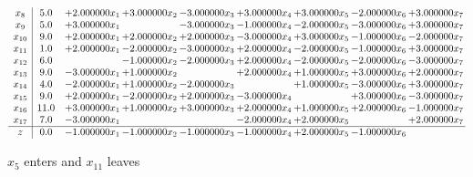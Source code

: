 \documentclass[10pt]{article}
\begin{document}
\[\begin{array}{c| c c@{\hskip 2pt} c@{\hskip 2pt} c@{\hskip 2pt} c@{\hskip 2pt} c@{\hskip 2pt} c@{\hskip 2pt} c@{\hskip 2pt} }
 x_{8}   &  5.0 & + 2.000000 x_{1} & + 3.000000 x_{2} & -3.000000 x_{3} & + 3.000000 x_{4} & + 3.000000 x_{5} & -2.000000 x_{6} & + 3.000000 x_{7}\\
 x_{9}   &  5.0 & + 3.000000 x_{1} &   & -3.000000 x_{3} & -1.000000 x_{4} & -2.000000 x_{5} & -3.000000 x_{6} & + 3.000000 x_{7}\\
 x_{10}   &  9.0 & + 2.000000 x_{1} & + 2.000000 x_{2} & + 2.000000 x_{3} & -3.000000 x_{4} & + 3.000000 x_{5} & -1.000000 x_{6} & -2.000000 x_{7}\\
 x_{11}   &  1.0 & + 2.000000 x_{1} & -2.000000 x_{2} & -3.000000 x_{3} & + 2.000000 x_{4} & -2.000000 x_{5} & -1.000000 x_{6} & + 3.000000 x_{7}\\
 x_{12}   &  6.0  &   & -1.000000 x_{2} & -2.000000 x_{3} & + 2.000000 x_{4} & -2.000000 x_{5} & -2.000000 x_{6} & -3.000000 x_{7}\\
 x_{13}   &  9.0 & -3.000000 x_{1} & + 1.000000 x_{2} &   & + 2.000000 x_{4} & + 1.000000 x_{5} & + 3.000000 x_{6} & + 2.000000 x_{7}\\
 x_{14}   &  4.0 & -2.000000 x_{1} & + 1.000000 x_{2} & -2.000000 x_{3} &   & + 1.000000 x_{5} & -3.000000 x_{6} & + 3.000000 x_{7}\\
 x_{15}   &  9.0 & + 2.000000 x_{1} & -2.000000 x_{2} & + 2.000000 x_{3} & -3.000000 x_{4} &   & + 3.000000 x_{6} & -3.000000 x_{7}\\
 x_{16}   &  11.0 & + 3.000000 x_{1} & + 1.000000 x_{2} & + 3.000000 x_{3} & + 2.000000 x_{4} & + 1.000000 x_{5} & + 2.000000 x_{6} & -1.000000 x_{7}\\
 x_{17}   &  7.0 & -3.000000 x_{1} &    &   & -2.000000 x_{4} & + 2.000000 x_{5} &   & + 2.000000 x_{7}\\
\hline
z    &  0.0 & -1.000000 x_{1} & -1.000000 x_{2} & -1.000000 x_{3} & -1.000000 x_{4} & + 2.000000 x_{5} & -1.000000 x_{6} &   \\
\end{array}\]


 $ x_{5} $ enters and $ x_{11} $ leaves 
\end{document}

